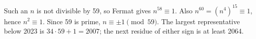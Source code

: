 Such an $n$ is not divisible by 59, so Fermat gives $n^{58}\equiv1$. Also $n^{60}=(n^4)^{15}\equiv1$, hence $n^2\equiv1$. Since 59 is prime, $n\equiv\pm1\pmod{59}$. The largest representative below 2023 is $34\cdot59+1=\boxed{2007}$; the next residue of either sign is at least 2064.
